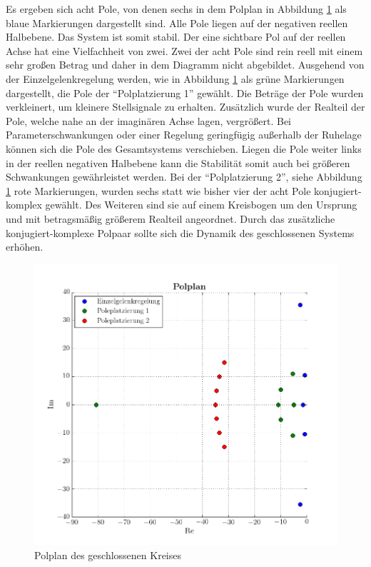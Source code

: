 Es ergeben sich acht Pole, von denen sechs in dem Polplan in Abbildung \ref{fig:Polplan} als blaue Markierungen dargestellt sind. Alle Pole liegen auf der negativen reellen Halbebene. Das System ist somit stabil.  Der eine sichtbare Pol auf der reellen Achse hat eine Vielfachheit von zwei. Zwei der acht Pole sind rein reell mit einem sehr großen Betrag und daher in dem Diagramm nicht abgebildet. \newline
Ausgehend von der Einzelgelenkregelung werden, wie in Abbildung \ref{fig:Polplan} als grüne Markierungen dargestellt, die Pole der "`Polplatzierung 1"' gewählt. Die Beträge der Pole wurden verkleinert, um kleinere Stellsignale zu erhalten. Zusätzlich  wurde der Realteil der Pole, welche nahe an der imaginären Achse lagen, vergrößert. Bei Parameterschwankungen oder einer Regelung geringfügig außerhalb der Ruhelage können sich die Pole des Gesamtsystems verschieben. Liegen die Pole weiter links in der reellen negativen Halbebene kann die Stabilität somit auch bei größeren Schwankungen gewährleistet werden.\newline
Bei der "`Polplatzierung 2"', siehe Abbildung \ref{fig:Polplan} rote Markierungen, wurden sechs statt wie bisher vier der acht Pole konjugiert-komplex gewählt. Des Weiteren sind sie auf einem Kreisbogen um den Ursprung und mit betragsmäßig größerem Realteil angeordnet. Durch das zusätzliche konjugiert-komplexe Polpaar sollte sich die Dynamik des geschlossenen Systems erhöhen. \newline
	
	\begin{figure}[h!]
		\centering
		\includegraphics[scale=0.5]{Bilder/Pole.png}
		\caption{Polplan des geschlossenen Kreises}
		\label{fig:Polplan}
	\end{figure}
	
